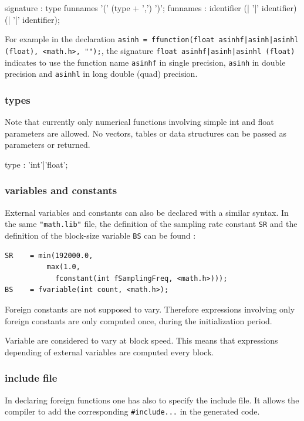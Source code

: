 \begin{rail}
signature : type funnames '(' (type + ',') ')';
funnames : identifier (| '|' identifier) (| '|' identifier);
\end{rail}

For example in the declaration \lstinline'asinh = ffunction(float asinhf|asinh|asinhl (float), <math.h>, "");', the signature  \lstinline'float asinhf|asinh|asinhl (float)' indicates to use the function name \lstinline'asinhf' in single precision, \lstinline'asinh' in double precision and \lstinline'asinhl' in long double (quad) precision.


\subsubsection{types}
Note that currently only numerical functions involving simple int and float parameters are allowed. No vectors, tables or data structures can be passed as parameters or returned.

\begin{rail}
type : 'int'|'float';
\end{rail}

\subsubsection{variables and constants} 
External variables and constants can also be declared with a similar syntax. In the same \lstinline'"math.lib"' file, the definition of the sampling rate constant \lstinline'SR' and the definition of the block-size variable \lstinline'BS' can be found :

\begin{lstlisting}
SR    = min(192000.0, 
	      max(1.0, 
	    	fconstant(int fSamplingFreq, <math.h>)));
BS    = fvariable(int count, <math.h>);
\end{lstlisting}

Foreign constants are not supposed to vary. Therefore expressions involving only foreign constants are only computed once, during the initialization period. 

Variable are considered to vary at block speed. This means that expressions depending of external variables are computed every block.

\subsubsection{include file}
In declaring foreign functions one has also to specify the include file. It allows the \faust compiler to add the corresponding \lstinline'#include...' in the generated code.

